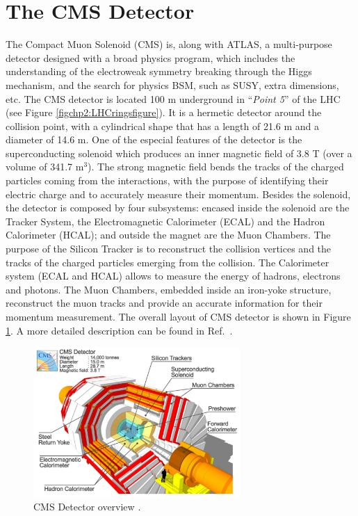\section{The CMS Detector}
\label{sec:CMS}

The Compact Muon Solenoid (CMS) is, along with ATLAS, a multi-purpose detector designed 
with a broad physics program, which includes the understanding of the 
electroweak symmetry breaking through the Higgs mechanism, 
and the search for physics BSM, such as SUSY, extra dimensions, etc. The CMS 
detector is located 100 m underground in ``\textit{Point 5}'' of the 
LHC (see Figure \ref{figchp2:LHCringsfigure}). It is a hermetic detector around the collision
point, with a cylindrical shape that has a length of 21.6 m and a diameter of 14.6 m. One of 
the especial features of the detector is the superconducting solenoid which produces an inner magnetic field 
of $3.8$ T (over a volume of 341.7 m$^{3}$). The strong magnetic field bends the tracks 
of the charged particles coming from the interactions, with the purpose of identifying their 
electric charge and to accurately measure their momentum. Besides the solenoid, the detector 
is composed by four subsystems: encased inside the solenoid are the Tracker System, the 
Electromagnetic Calorimeter (ECAL) and the Hadron Calorimeter (HCAL); and outside the 
magnet are the Muon Chambers. The purpose of the Silicon Tracker is to reconstruct 
the collision vertices and the tracks of the charged particles emerging from the 
collision. The Calorimeter system (ECAL and HCAL) allows to measure the energy of hadrons, electrons and 
photons. The Muon Chambers, embedded inside an iron-yoke structure, reconstruct the 
muon tracks and provide an accurate information for their momentum measurement. The overall layout of CMS detector is shown 
in Figure \ref{figchp2:CMSdetectorfigure}. A more detailed description can be found in Ref.~\cite{chp2:CMS}. \\

\begin{figure}[ht]
    \begin{center}
      \includegraphics[width=0.7\textwidth]{figuras/Chapter2/CMSdetector.pdf}
       \caption{CMS Detector overview \cite{chp2:CMSTDR}.}\label{figchp2:CMSdetectorfigure}
\end{center}
\end{figure}

